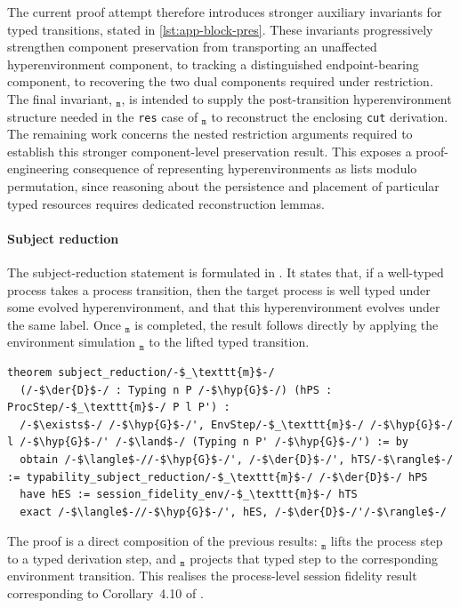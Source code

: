 The current proof attempt therefore introduces stronger auxiliary invariants for typed transitions, stated in \cref{lst:app-block-pres}. These invariants progressively strengthen component preservation from transporting an unaffected hyperenvironment component, to tracking a distinguished endpoint-bearing component, to recovering the two dual components required under restriction. The final invariant, $_{\texttt{m}}$, is intended to supply the post-transition hyperenvironment structure needed in the \texttt{res} case of $_{\texttt{m}}$ to reconstruct the enclosing \texttt{cut} derivation. The remaining work concerns the nested restriction arguments required to establish this stronger component-level preservation result. This exposes a proof-engineering consequence of representing hyperenvironments as lists modulo permutation, since reasoning about the persistence and placement of particular typed resources requires dedicated reconstruction lemmas.

\paragraph{Subject reduction} The subject-reduction statement is formulated in . It states that, if a well-typed process takes a process transition, then the target process is well typed under some evolved hyperenvironment, and that this hyperenvironment evolves under the same label. Once $_\texttt{m}$ is completed, the result follows directly by applying the environment simulation $_\texttt{m}$ to the lifted typed transition.

\begin{lstlisting}[language=Lean4]
theorem subject_reduction/-$_\texttt{m}$-/
  (/-$\der{D}$-/ : Typing n P /-$\hyp{G}$-/) (hPS : ProcStep/-$_\texttt{m}$-/ P l P') :
  /-$\exists$-/ /-$\hyp{G}$-/', EnvStep/-$_\texttt{m}$-/ /-$\hyp{G}$-/ l /-$\hyp{G}$-/' /-$\land$-/ (Typing n P' /-$\hyp{G}$-/') := by
  obtain /-$\langle$-//-$\hyp{G}$-/', /-$\der{D}$-/', hTS/-$\rangle$-/ := typability_subject_reduction/-$_\texttt{m}$-/ /-$\der{D}$-/ hPS
  have hES := session_fidelity_env/-$_\texttt{m}$-/ hTS
  exact /-$\langle$-//-$\hyp{G}$-/', hES, /-$\der{D}$-/'/-$\rangle$-/
\end{lstlisting}

The proof is a direct composition of the previous results: $_\texttt{m}$ lifts the process step to a typed derivation step, and $_\texttt{m}$ projects that typed step to the corresponding environment transition. This realises the process-level session fidelity result corresponding to Corollary~4.10 of \citet{abs-2106-11818}.

